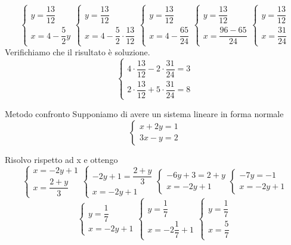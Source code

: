 \[
\begin{cases}
y=\dfrac{13}{12}\\
x=4-\dfrac{5}{2}y
\end{cases}
\begin{cases}
y=\dfrac{13}{12}\\
x=4-\dfrac{5}{2}\cdot\dfrac{13}{12}
\end{cases}
\begin{cases}
y=\dfrac{13}{12}\\
x=4-\dfrac{65}{24}
\end{cases}
\begin{cases}
y=\dfrac{13}{12}\\
x=\dfrac{96-65}{24}
\end{cases}
\begin{cases}
y=\dfrac{13}{12}\\
x=\dfrac{31}{24}
\end{cases}
\]
Verifichiamo che il risultato è soluzione. 
\[
\begin{cases}
4\cdot\dfrac{13}{12}-2\cdot\dfrac{31}{24}=3\\
2\cdot\dfrac{13}{12}+5\cdot\dfrac{31}{24}=8
\end{cases}
\]
 \begin{esempiot}{Metodo confronto}{}                  
Supponiamo di avere un sistema lineare in forma normale
\[
\begin{cases}
	x+2y=1\\
	3x-y=2
\end{cases}
\]
\end{esempiot}
Risolvo rispetto ad x e ottengo
\[ 
\begin{cases}
	x=-2y+1\\
	x=\dfrac{2+y}{3}
\end{cases}
\begin{cases}
	-2y+1=\dfrac{2+y}{3}\\
		x=-2y+1
\end{cases}
\begin{cases}
	-6y+3=2+y\\
	x=-2y+1
\end{cases}
\begin{cases}
	-7y=-1\\
	x=-2y+1
\end{cases}
\]
\[
\begin{cases}
	y=\dfrac{1}{7}\\
	x=-2y+1
\end{cases}
\begin{cases}
	y=\dfrac{1}{7}\\
	x=-2\dfrac{1}{7}+1
\end{cases}
\begin{cases}
	y=\dfrac{1}{7}\\
	x=\dfrac{5}{7}
\end{cases}
\]

